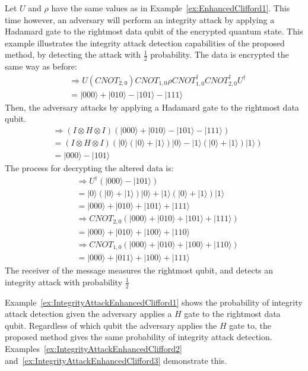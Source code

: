 \begin{example}
\label{ex:IntegrityAttackEnhancedClifford1}
	Let $U$ and $\rho$ have the same values as in Example~\ref{ex:EnhancedClifford1}. This time however, an adversary will perform an integrity attack by applying a Hadamard gate to the rightmost data qubit of the encrypted quantum state. This example illustrates the integrity attack detection capabilities of the proposed method, by detecting the attack with $\frac{1}{2}$ probability. The data is encrypted the same way as before:
	\begin{align}
	& \Rightarrow U (\mathit{CNOT}_{2,0})\mathit{CNOT}_{1,0}\rho \mathit{CNOT}_{1,0}^{\dagger}\mathit{CNOT}_{2,0}^{\dagger} U^{\dagger}\\
	&= |000\rangle + |010\rangle - |101\rangle - |111\rangle
	\end{align}
	Then, the adversary attacks by applying a Hadamard gate to the rightmost data qubit.
	\begin{align}
	& \Rightarrow (I \otimes H \otimes I)(|000\rangle + |010\rangle - |101\rangle - |111\rangle)\\
	& = (I \otimes H \otimes I)(|0\rangle(|0\rangle + |1\rangle)|0\rangle - |1\rangle(|0\rangle + |1\rangle)|1\rangle)\\
	&= |000\rangle - |101\rangle
	\end{align}
	The process for decrypting the altered data is:
	\begin{align}
	& \Rightarrow U^{\dagger}(|000\rangle - |101\rangle)\\
	&= |0\rangle(|0\rangle + |1\rangle)|0\rangle + |1\rangle(|0\rangle + |1\rangle)|1\rangle\\
	&= |000\rangle + |010\rangle + |101\rangle + |111\rangle\\ 
	& \Rightarrow \mathit{CNOT}_{2,0} (|000\rangle + |010\rangle + |101\rangle + |111\rangle)\\
	&= |000\rangle + |010\rangle + |100\rangle + |110\rangle\\
	& \Rightarrow \mathit{CNOT}_{1,0} (|000\rangle + |010\rangle + |100\rangle + |110\rangle)\\
	&= |000\rangle + |011\rangle + |100\rangle + |111\rangle
	\end{align}
The receiver of the message measures the rightmost qubit, and detects an integrity attack with probability $\frac{1}{2}$
\end{example}
Example~\ref{ex:IntegrityAttackEnhancedClifford1} shows the probability of integrity attack detection given the adversary applies a $H$ gate to the rightmost data qubit. Regardless of which qubit the adversary applies the $H$ gate to, the proposed method gives the same probability of integrity attack detection. Examples~\ref{ex:IntegrityAttackEnhancedClifford2} and~\ref{ex:IntegrityAttackEnhancedClifford3} demonstrate this.
